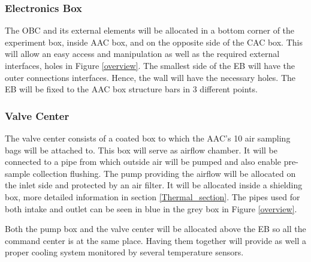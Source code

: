 \subsubsection{Electronics Box}

The OBC and its external elements will be allocated in a bottom corner of the experiment box, inside AAC box, and on the opposite side of the CAC box. This will allow an easy access and manipulation as well as the required external interfaces, holes in Figure \ref{overview}. The smallest side of the EB will have the outer connections interfaces. Hence, the wall will have the necessary holes. The EB will be fixed to the AAC box structure bars in 3 different points.




\pagebreak
\subsubsection{Valve Center}

The valve center consists of a coated box to which the AAC's 10 air sampling bags will be attached to. This box will serve as airflow chamber. It will be connected to a pipe from which outside air will be pumped and also enable pre-sample collection flushing. The pump providing the airflow will be allocated on the inlet side and protected by an air filter. It will be allocated inside a shielding box, more detailed information in section \ref{Thermal_section}. The pipes used for both intake and outlet can be seen in blue in the grey box in Figure \ref{overview}.

\smallskip
Both the pump box and the valve center will be allocated above the EB so all the command center is at the same place. Having them together will provide as well a proper cooling system monitored by several temperature sensors. %



